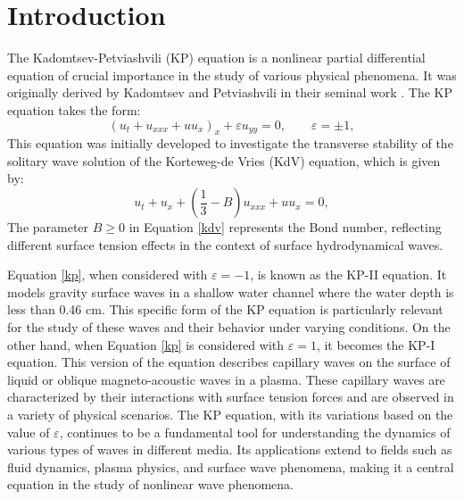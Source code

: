\documentclass[10pt]{article}
\numberwithin{equation}{section}
\begin{document}
	
	
	
	
	
	
	
	
	\section{Introduction}
	The Kadomtsev-Petviashvili (KP) equation is a nonlinear partial differential equation of crucial importance in the study of various physical phenomena. It was originally derived by Kadomtsev and Petviashvili in their seminal work \cite{kp}. The KP equation takes the form:
	\begin{equation}\label{kp}
		(u_t + u_{xxx} + uu_x)_x + \varepsilon u_{yy} = 0, \qquad \varepsilon = \pm 1,
	\end{equation}
	This equation was initially developed to investigate the transverse stability of the solitary wave solution of the Korteweg-de Vries (KdV) equation, which is given by:
	\begin{equation}\label{kdv}
		u_t + u_x + \left(\frac13 - B\right)u_{xxx} + uu_x = 0,
	\end{equation}
	The parameter $B \geq 0$ in Equation \eqref{kdv} represents the Bond number, reflecting different surface tension effects in the context of surface hydrodynamical waves.
	
	Equation \eqref{kp}, when considered with $\varepsilon = -1$, is known as the KP-II equation. It models gravity surface waves in a shallow water channel where the water depth is less than 0.46 cm. This specific form of the KP equation is particularly relevant for the study of these waves and their behavior under varying conditions.
	On the other hand, when Equation \eqref{kp} is considered with $\varepsilon = 1$, it becomes the KP-I equation. This version of the equation describes capillary waves on the surface of liquid or oblique magneto-acoustic waves in a plasma. These capillary waves are characterized by their interactions with surface tension forces and are observed in a variety of physical scenarios.
	The KP equation, with its variations based on the value of $\varepsilon$, continues to be a fundamental tool for understanding the dynamics of various types of waves in different media. Its applications extend to fields such as fluid dynamics, plasma physics, and surface wave phenomena, making it a central equation in the study of nonlinear wave phenomena.
	
\end{document}
